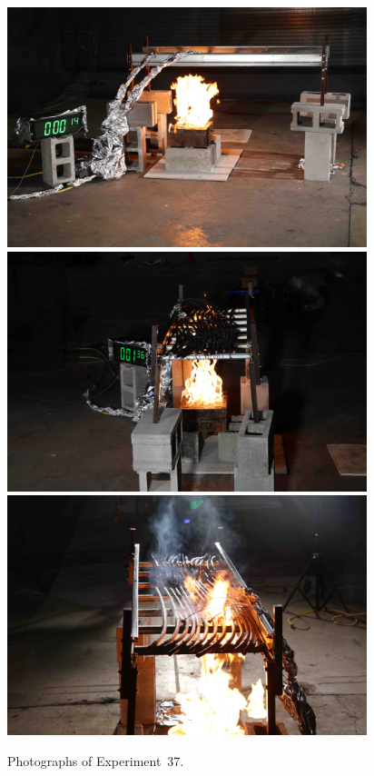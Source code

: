 \documentclass[12pt]{article}
\begin{document}
\begin{figure}[p]
\centering
\includegraphics[height=2.75in]{../FIGURES/Test_37_side} \\
\includegraphics[height=2.75in]{../FIGURES/Test_37_1_min_36_s} \\
\includegraphics[height=2.75in]{../FIGURES/Test_37_ignition}
\caption[Photographs of Experiment~37]{Photographs of Experiment~37.}
\label{fig:Test_37_photos}
\end{figure}


\clearpage
\end{document}
